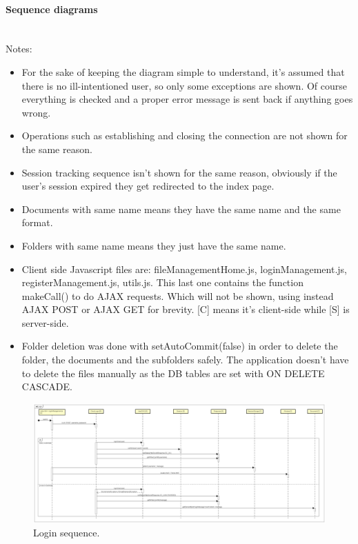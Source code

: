 \documentclass[a4paper,12pt]{article}
\newcommand{\myparagraph}[1]{\paragraph{#1}\mbox{}\\}
\begin{document}
\newpage
\myparagraph{Sequence diagrams}
Notes:
\begin{itemize} 
	\item{For the sake of keeping the diagram simple to understand, it's assumed that there is no ill-intentioned user, so only some exceptions are shown. Of course everything is checked and a proper error message is sent back if anything goes wrong.}
	\item{Operations such as establishing and closing the connection are not shown for the same reason.}
	\item{Session tracking sequence isn't shown for the same reason, obviously if the user's session expired they get redirected to the index page.}
	\item{Documents with same name means they have the same name and the same format.}
	\item{Folders with same name means they just have the same name.}
	\item{Client side Javascript files are: fileManagementHome.js, loginManagement.js, registerManagement.js, utils.js. This last one contains the function makeCall() to do AJAX requests. Which will not be shown, using instead AJAX POST or AJAX GET for brevity. [C] means it's client-side while [S] is server-side.}
	\item{Folder deletion was done with setAutoCommit(false) in order to delete the folder, the documents and the subfolders safely. The application doesn't have to delete the files manually as the DB tables are set with ON DELETE CASCADE.}
\end{itemize}

\begin{figure}[H]
    \centering
     \includegraphics[width=1.0\textwidth]{JS/SequenceDiagram/Login.png}
    \caption{Login sequence.}
\end{figure}
\end{document}

